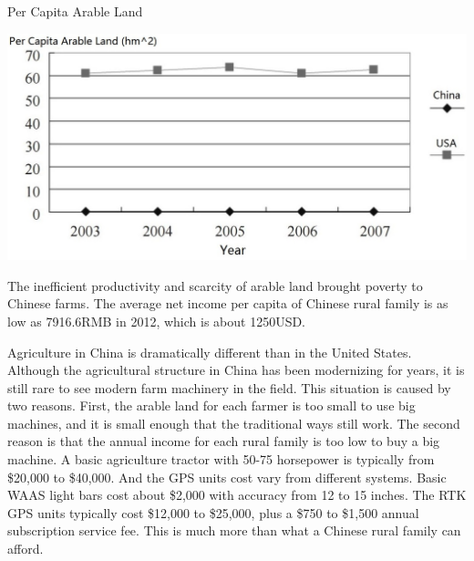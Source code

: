 \begin{table}[ht!]
\begin{center}
\caption{Per Capita Arable Land}
\includegraphics[scale = 0.45]{pics/capitahm2.jpg}
\end{center}
\end{table}
The inefficient productivity and scarcity of arable land brought poverty to Chinese farms. The average net income per capita of Chinese rural family is as low as 7916.6RMB in 2012, which is about 1250USD. \cite{income2012} 

Agriculture in China is dramatically different than in the United States. Although the agricultural structure in China has been modernizing for years, it is still rare to see  modern farm machinery in the field. This situation is caused by two reasons. First, the arable land for each farmer is too small to use big machines, and it is small enough that the traditional ways still work. The second reason is that the annual income for each rural family is too low to buy a big machine. A basic agriculture tractor with 50-75 horsepower is typically from \$20,000 to \$40,000.\cite{tractorcost} And the GPS units cost vary from different systems. Basic WAAS light bars cost about \$2,000 with accuracy from 12 to 15 inches. The RTK GPS units typically cost \$12,000 to \$25,000, plus a \$750 to \$1,500 annual subscription service fee.\cite{PriceR} This is much more than what a Chinese rural family can afford. 



